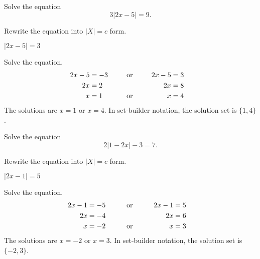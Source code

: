 	\begin{multicols}{2}

		\begin{example}
			Solve the equation
			\[3|2x-5|=9.\]
		\end{example}
		\vspace{-0.5\baselineskip}
		\begin{solution}
			Rewrite the equation into $|X|=c$ form.\\
			\centerline{$|2x-5|=3$}
			Solve the equation.
				\begin{alignat*}{3}
					2x-5 & =-3 &  & \ctc{or} & 2x-5 & =3 \\
					2x   & =2  &  &          & 2x   & =8 \\
					x    & =1  &  & \ctc{or} & x    & =4
				\end{alignat*}
			The solutions are $x=1$ or $x=4$. In set-builder notation, the solution set is $\{1, 4\}$.
		\end{solution}

		\columnbreak


		\begin{example}
			Solve the equation
			\[2|1-2x|-3=7.\]
		\end{example}
		\vspace{-0.5\baselineskip}
		\begin{solution}
			Rewrite the equation into $|X|=c$ form.\\
			\centerline{$|2x-1|=5$}
			Solve the equation.
				\begin{alignat*}{3}
					2x-1 & =-5 &  & \ctc{ or } & 2x-1 & =5 \\
					2x   & =-4 &  &            & 2x   & =6 \\
					x    & =-2 &  & \ctc{or}   & x    & =3
				\end{alignat*}
			The solutions are $x=-2$ or $x=3$. In set-builder notation, the solution set is $\{-2, 3\}$.
		\end{solution}
	\end{multicols}

